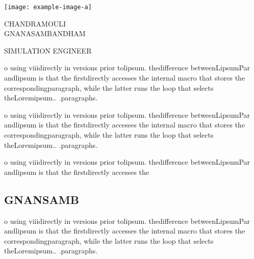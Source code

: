 \documentclass{mycv}
\begin{document}
\sloppy %
\color{templateColor1}
\AddToShipoutPicture{\BackgroundPic}

\normalfont
\begin{minipage}[c]{0.3\textwidth}
	\centering
	\texttt{[image: example-image-a]}
\end{minipage}
\begin{minipage}[c]{0.7\textwidth}
\vspace{5mm}
\Huge{CHANDRAMOULI}\\
\Huge{GNANASAMBANDHAM}

\vspace{3mm}
\large{SIMULATION ENGINEER}
\vspace{40mm}
\end{minipage}

{\rlap{\color{templateColor1}\rule[0mm]{\textwidth}{\ulinewidth}}}
\setlength{\columnsep}{2.2em}
\setlength{\columnseprule}{\ulinewidth}
\begin{paracol}{2}
		o using viiidirectly in versions prior tolipsum.  thedifference
		betweenLipsumPar andlipsum is that the firstdirectly accesses the
		internal macro that stores the correspondingparagraph, while the latter
		runs the loop that selects theLoremipsum.. .paragraphs.

		o using viiidirectly in versions prior tolipsum.  thedifference
		betweenLipsumPar andlipsum is that the firstdirectly accesses the
		internal macro that stores the correspondingparagraph, while the latter
		runs the loop that selects theLoremipsum.. .paragraphs.

\switchcolumn

		o using viiidirectly in versions prior tolipsum.  thedifference
		betweenLipsumPar andlipsum is that the firstdirectly accesses the


\subsection{GNANSAMB}
o using viiidirectly in versions prior tolipsum.  thedifference
betweenLipsumPar andlipsum is that the firstdirectly accesses the
internal macro that stores the correspondingparagraph, while the latter
runs the loop that selects theLoremipsum.. .paragraphs.


\lipsum[10]
\flushpage
\end{paracol}
\end{document}
